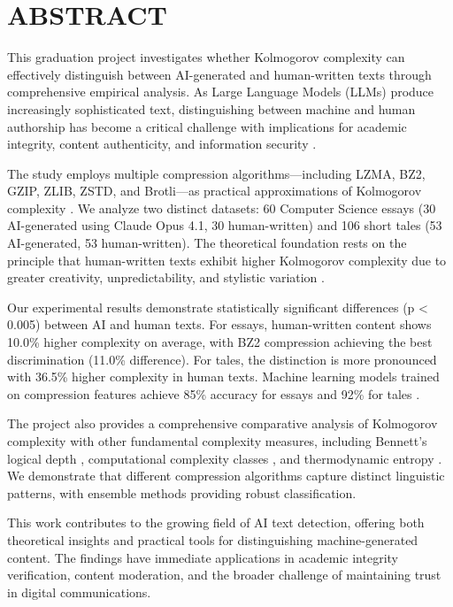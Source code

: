 \documentclass[12pt,a4paper]{report}
\begin{document}
\setcounter{page}{1}

\chapter*{ABSTRACT}

This graduation project investigates whether Kolmogorov complexity can effectively distinguish between AI-generated and human-written texts through comprehensive empirical analysis. As Large Language Models (LLMs) produce increasingly sophisticated text, distinguishing between machine and human authorship has become a critical challenge with implications for academic integrity, content authenticity, and information security \cite{kolmogorov1965three}.

The study employs multiple compression algorithms—including LZMA, BZ2, GZIP, ZLIB, ZSTD, and Brotli—as practical approximations of Kolmogorov complexity \cite{li2008introduction}. We analyze two distinct datasets: 60 Computer Science essays (30 AI-generated using Claude Opus 4.1, 30 human-written) and 106 short tales (53 AI-generated, 53 human-written). The theoretical foundation rests on the principle that human-written texts exhibit higher Kolmogorov complexity due to greater creativity, unpredictability, and stylistic variation \cite{bennett1988logical}.

Our experimental results demonstrate statistically significant differences (p < 0.005) between AI and human texts. For essays, human-written content shows 10.0\% higher complexity on average, with BZ2 compression achieving the best discrimination (11.0\% difference). For tales, the distinction is more pronounced with 36.5\% higher complexity in human texts. Machine learning models trained on compression features achieve 85\% accuracy for essays and 92\% for tales \cite{cilibrasi2005clustering}.

The project also provides a comprehensive comparative analysis of Kolmogorov complexity with other fundamental complexity measures, including Bennett's logical depth \cite{bennett1988logical}, computational complexity classes \cite{allender2006kolmogorov}, and thermodynamic entropy \cite{zurek1989algorithmic}. We demonstrate that different compression algorithms capture distinct linguistic patterns, with ensemble methods providing robust classification.

This work contributes to the growing field of AI text detection, offering both theoretical insights and practical tools for distinguishing machine-generated content. The findings have immediate applications in academic integrity verification, content moderation, and the broader challenge of maintaining trust in digital communications.
\end{document}
